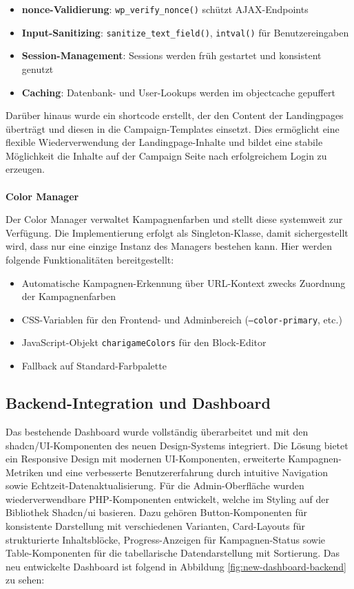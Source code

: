 \begin{itemize}
    \item \textbf{\gls{nonce}-Validierung}: \texttt{wp\_verify\_nonce()} schützt AJAX-Endpoints
    \item \textbf{Input-Sanitizing}: \texttt{sanitize\_text\_field()}, \texttt{intval()} für Benutzereingaben
    \item \textbf{Session-Management}: Sessions werden früh gestartet und konsistent genutzt
    \item \textbf{Caching}: Datenbank- und User-Lookups werden im \gls{objectcache} gepuffert
\end{itemize}

Darüber hinaus wurde ein \gls{shortcode} erstellt, der den Content der Landingpages überträgt und diesen in die Campaign-Templates einsetzt.
Dies ermöglicht eine flexible Wiederverwendung der Landingpage-Inhalte und bildet eine stabile Möglichkeit die Inhalte auf der Campaign Seite nach erfolgreichem Login zu erzeugen.
\\\\
\textbf{Color Manager}

Der Color Manager verwaltet Kampagnenfarben und stellt diese systemweit zur Verfügung.
Die Implementierung erfolgt als Singleton-Klasse, damit sichergestellt wird, dass nur eine einzige Instanz des Managers bestehen kann.
Hier werden folgende Funktionalitäten bereitgestellt:

\begin{itemize}
    \item Automatische Kampagnen-Erkennung über URL-Kontext zwecks Zuordnung der Kampagnenfarben
    \item CSS-Variablen für den Frontend- und Adminbereich (\texttt{--color-primary}, etc.)
    \item JavaScript-Objekt \texttt{charigameColors} für den Block-Editor
    \item Fallback auf Standard-Farbpalette
\end{itemize}

\subsection{Backend-Integration und Dashboard}

Das bestehende Dashboard wurde vollständig überarbeitet und mit den shadcn/UI-Komponenten des neuen Design-Systems integriert.
Die Lösung bietet ein Responsive Design mit modernen UI-Komponenten, erweiterte Kampagnen-Metriken und eine verbesserte Benutzererfahrung durch intuitive Navigation sowie Echtzeit-Datenaktualisierung.
Für die Admin-Oberfläche wurden wiederverwendbare PHP-Komponenten entwickelt, welche im Styling auf der Bibliothek Shadcn/ui basieren.
Dazu gehören Button-Komponenten für konsistente Darstellung mit verschiedenen Varianten, Card-Layouts für strukturierte Inhaltsblöcke, Progress-Anzeigen für Kampagnen-Status sowie Table-Komponenten für die tabellarische Datendarstellung mit Sortierung.
Das neu entwickelte Dashboard ist folgend in Abbildung \ref{fig:new-dashboard-backend} zu sehen:

